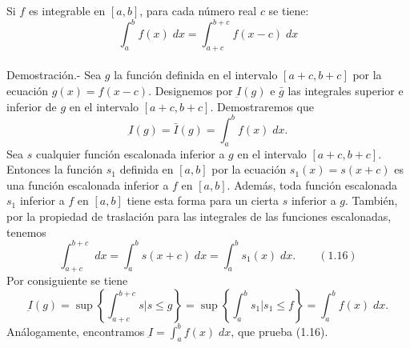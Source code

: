 \begin{teo} Si $f$ es integrable en $[a,b]$, para cada número real $c$ se tiene: $$\int_a^b f(x) \; dx = \int_{a+c}^{b+c} f(x-c)\; dx$$\\
    Demostración.-\; Sea $g$ la función definida en el intervalo $[a+c,b+c]$ por la ecuación $g(x) = f(x-c)$. Designemos por $\underbar{I}(g)$ e $\bar{g}$ las integrales superior e inferior de $g$ en el intervalo $[a+c,b+c]$. Demostraremos que $$\underbar{I}(g) = \bar{I}(g) = \int_a^b f(x) \; dx.$$
    Sea $s$ cualquier función escalonada inferior a $g$ en el intervalo $[a+c,b+c]$. Entonces la función $s_1$ definida en $[a,b]$ por la ecuación $s_1(x) = s(x+c)$ es una función escalonada inferior a $f$ en $[a,b]$. Además, toda función escalonada $s_1$ inferior a $f$ en $[a,b]$ tiene esta forma para un cierta $s$ inferior a $g$. También, por la propiedad de traslación para las integrales de las funciones escalonadas, tenemos $$\int_{a+c}^{b+c} \; dx = \int_a^b s(x+c)\; dx = \int_a^b s_1(x)\; dx. \qquad (1.16)$$
    Por consiguiente se tiene $$\underbar{I}(g) = \sup\left\{\int_{a+c}^{b+c} s | s \leq g\right\} =  \sup \left\{\int_a^b s_1 | s_1 \leq f\right\} = \int_a^b f(x) \; dx.$$
    Análogamente, encontramos $\underbar{I} = \int_a^b f(x)\; dx$, que prueba (1.16).\\\\ 
    
\end{teo}

